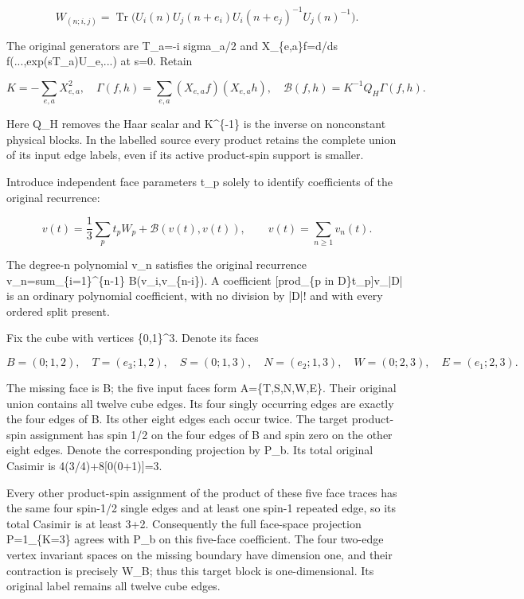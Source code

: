 \documentclass[11pt]{article}
\begin{document}
\[
 W_{(n;i,j)}=\operatorname{Tr}\bigl(U_i(n)U_j(n+e_i)
 U_i(n+e_j)^{-1}U_j(n)^{-1}\bigr). \tag{C1}
\]

The original generators are T\_a=-i sigma\_a/2 and X\_\{e,a\}f=d/ds f(...,exp(sT\_a)U\_e,...) at s=0. Retain

\[
 K=-\sum_{e,a}X_{e,a}^2,\quad
 \Gamma(f,h)=\sum_{e,a}(X_{e,a}f)(X_{e,a}h),\quad
 \mathcal B(f,h)=K^{-1}Q_H\Gamma(f,h). \tag{C2}
\]

Here Q\_H removes the Haar scalar and K\textasciicircum{}\{-1\} is the inverse on nonconstant physical blocks. In the labelled source every product retains the complete union of its input edge labels, even if its active product-spin support is smaller.

Introduce independent face parameters t\_p solely to identify coefficients of the original recurrence:

\[
 v(t)=\frac13\sum_pt_pW_p+\mathcal B(v(t),v(t)),\qquad
 v(t)=\sum_{n\ge1}v_n(t). \tag{C3}
\]

The degree-n polynomial v\_n satisfies the original recurrence v\_n=sum\_\{i=1\}\textasciicircum{}\{n-1\} B(v\_i,v\_\{n-i\}). A coefficient [prod\_\{p in D\}t\_p]v\_|D| is an ordinary polynomial coefficient, with no division by |D|! and with every ordered split present.

Fix the cube with vertices \{0,1\}\textasciicircum{}3. Denote its faces

\[
 B=(0;1,2),\quad T=(e_3;1,2),\quad
 S=(0;1,3),\quad N=(e_2;1,3),\quad
 W=(0;2,3),\quad E=(e_1;2,3). \tag{C4}
\]

The missing face is B; the five input faces form A=\{T,S,N,W,E\}. Their original union contains all twelve cube edges. Its four singly occurring edges are exactly the four edges of B. Its other eight edges each occur twice. The target product-spin assignment has spin 1/2 on the four edges of B and spin zero on the other eight edges. Denote the corresponding projection by P\_b. Its total original Casimir is 4(3/4)+8[0(0+1)]=3.

Every other product-spin assignment of the product of these five face traces has the same four spin-1/2 single edges and at least one spin-1 repeated edge, so its total Casimir is at least 3+2. Consequently the full face-space projection P=1\_\{K=3\} agrees with P\_b on this five-face coefficient. The four two-edge vertex invariant spaces on the missing boundary have dimension one, and their contraction is precisely W\_B; thus this target block is one-dimensional. Its original label remains all twelve cube edges.
\end{document}
